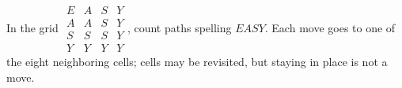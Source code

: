 In the grid $\begin{array}{cccc}E&A&S&Y\\A&A&S&Y\\S&S&S&Y\\Y&Y&Y&Y\end{array}$, count paths spelling $EASY$. Each move goes to one of the eight neighboring cells; cells may be revisited, but staying in place is not a move.
